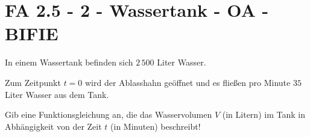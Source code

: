 \section{FA 2.5 - 2 - Wassertank - OA - BIFIE}

\begin{beispiel}[FA 2.5]{1} %
In einem Wassertank befinden sich $2\,500$ Liter Wasser.

Zum Zeitpunkt $t=0$ wird der Ablasshahn geöffnet und es fließen pro Minute $35$ Liter Wasser aus dem Tank.

Gib eine Funktionsgleichung an, die das Wasservolumen $V$ (in Litern) im Tank in Abhängigkeit von der Zeit $t$ (in Minuten) beschreibt!
\leer

\end{beispiel}